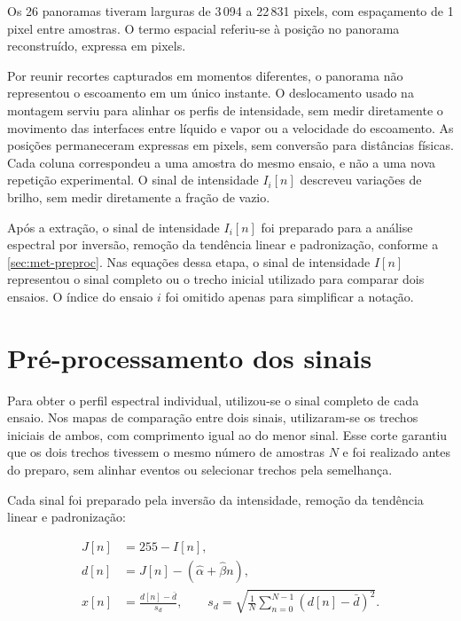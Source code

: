 Os 26 panoramas tiveram larguras de 3\,094 a 22\,831 pixels, com espaçamento
de 1 pixel entre amostras. O termo espacial referiu-se à posição no panorama
reconstruído, expressa em pixels.

Por reunir recortes capturados em momentos diferentes, o panorama não
representou o escoamento em um único instante. O deslocamento usado na
montagem serviu para alinhar os perfis de intensidade, sem medir diretamente
o movimento das interfaces entre líquido e vapor ou a velocidade do escoamento.
As posições permaneceram expressas em pixels, sem conversão para distâncias
físicas. Cada coluna correspondeu a uma amostra do mesmo ensaio, e não a
uma nova repetição experimental. O sinal de intensidade $I_i[n]$ descreveu
variações de brilho, sem medir diretamente a fração de vazio.

Após a extração, o sinal de intensidade $I_i[n]$ foi preparado para a análise
espectral por inversão, remoção da tendência linear e padronização, conforme
a \autoref{sec:met-preproc}. Nas equações dessa etapa, o sinal de intensidade
$I[n]$ representou o sinal completo ou o trecho inicial utilizado para comparar
dois ensaios. O índice do ensaio $i$ foi omitido apenas para simplificar a notação.

\section{Pré-processamento dos sinais}\label{sec:met-preproc}

Para obter o perfil espectral individual, utilizou-se o sinal completo de cada
ensaio. Nos mapas de comparação entre dois sinais, utilizaram-se os trechos
iniciais de ambos, com comprimento igual ao do menor sinal. Esse corte
garantiu que os dois trechos tivessem o mesmo número de amostras $N$ e foi
realizado antes do preparo, sem alinhar eventos ou selecionar trechos pela
semelhança.

Cada sinal foi preparado pela inversão da intensidade, remoção da tendência
linear e padronização:

\begin{align}
  J[n]&=255-I[n], \label{eq:met-inversao}\\
  d[n]&=J[n]-(\widehat\alpha+\widehat\beta n), \label{eq:met-tendencia}\\
  x[n]&=\frac{d[n]-\bar d}{s_d},\qquad
  s_d=\sqrt{\frac{1}{N}\sum_{n=0}^{N-1}(d[n]-\bar d)^2}.
  \label{eq:met-padronizacao}
\end{align}

